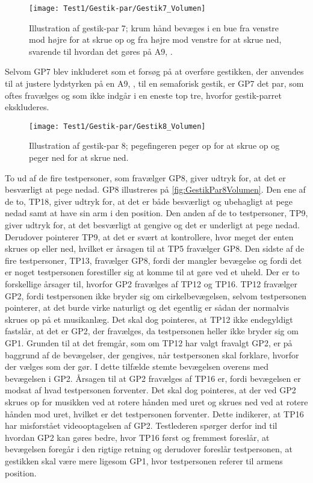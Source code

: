 %
\begin{figure}[H]
	\centering
	\texttt{[image: Test1/Gestik-par/Gestik7\_Volumen]}
	\caption{Illustration af gestik-par 7; krum hånd bevæges i en bue fra venstre mod højre for at skrue op og fra højre mod venstre for at skrue ned, svarende til hvordan det gøres på A9, \parencite{WEB:BeoplayA9}.}
	\label{fig:GestikPar7Volumen}
\end{figure}
\noindent
%
Selvom GP7 blev inkluderet som et forsøg på at overføre gestikken, der anvendes til at justere lydstyrken på en A9, \parencite{WEB:BeoplayA9}, til en semaforisk gestik, er GP7 det par, som oftes fravælges og som ikke indgår i en eneste top tre, hvorfor gestik-parret ekskluderes.
%
\begin{figure}[H]
	\centering
	\texttt{[image: Test1/Gestik-par/Gestik8\_Volumen]}
	\caption{Illustration af gestik-par 8; pegefingeren peger op for at skrue op og peger ned for at skrue ned.}
	\label{fig:GestikPar8Volumen}
\end{figure}
\noindent
%
To ud af de fire testpersoner, som fravælger GP8, giver udtryk for, at det er besværligt at pege nedad. GP8 illustreres på \autoref{fig:GestikPar8Volumen}. Den ene af de to, TP18, giver udtryk for, at det er både besværligt og ubehagligt at pege nedad samt at have sin arm i den position. Den anden af de to testpersoner, TP9, giver udtryk for, at det besværligt at gengive og det er underligt at pege nedad. Derudover pointerer TP9, at det er svært at kontrollere, hvor meget der enten skrues op eller ned, hvilket er årsagen til at TP5 fravælger GP8. Den sidste af de fire testpersoner, TP13, fravælger GP8, fordi der mangler bevægelse og fordi det er noget testpersonen forestiller sig at komme til at gøre ved et uheld. \blankline 
%
Der er to forskellige årsager til, hvorfor GP2 fravælges af TP12 og TP16. TP12 fravælger GP2, fordi testpersonen ikke bryder sig om cirkelbevægelsen, selvom testpersonen pointerer, at det burde virke naturligt og det egentlig er sådan der normalvis skrues op på et musikanlæg. Det skal dog pointeres, at TP12 ikke endegyldigt fastslår, at det er GP2, der fravælges, da testpersonen heller ikke bryder sig om GP1. Grunden til at det fremgår, som om TP12 har valgt fravalgt GP2, er på baggrund af de bevægelser, der gengives, når testpersonen skal forklare, hvorfor der vælges som der gør. I dette tilfælde stemte bevægelsen overens med bevægelsen i GP2. Årsagen til at GP2 fravælges af TP16 er, fordi bevægelsen er modsat af hvad testpersonen forventer. Det skal dog pointeres, at der ved GP2 skrues op for musikken ved at rotere hånden med uret og skrues ned ved at rotere hånden mod uret, hvilket er det testpersonen forventer. Dette indikerer, at TP16 har misforstået videooptagelsen af GP2. Testlederen spørger derfor ind til hvordan GP2 kan gøres bedre, hvor TP16 først og fremmest foreslår, at bevægelsen foregår i den rigtige retning og derudover foreslår testpersonen, at gestikken skal være mere ligesom GP1, hvor testpersonen referer til armens position. 

